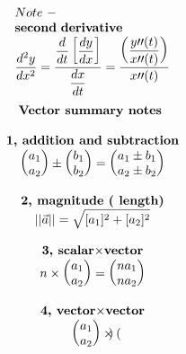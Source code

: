 \documentclass{article}
\begin{document}
\begin{multicols}{2}
\[\begin{array}{>{\displaystyle}l}
        \\
        Note\ -\ \\
        \mathbf{second\ derivative}\\
        \frac{d^{2} y}{dx^{2}} =\frac{\displaystyle \frac{d}{dt}\left[\displaystyle \frac{dy}{dx}\right]}{\displaystyle \frac{dx}{dt}} =\displaystyle  \frac{\left(\displaystyle \frac{y\prime \prime ( t)}{x\prime \prime ( t)}\right)}{x\prime \prime ( t)}    
    \end{array}
    \]
    \columnbreak
    \noindent 
    \[
    \begin{array}{>{\displaystyle}c}
        \textbf{Vector\ summary\ notes\ }\\
        \\
        \textbf{1, addition\ and\ subtraction}\\
        \begin{pmatrix}
        a_{1}\\
        a_{2}
        \end{pmatrix} \pm \begin{pmatrix}
        b_{1}\\
        b_{2}
        \end{pmatrix} =\begin{pmatrix}
        a_{1} \pm b_{1}\\
        a_{2} \pm b_{2}
        \end{pmatrix}\\
        \\
        \textbf{2, magnitude\ ( length)}\\
        ||\vec{a} ||=\sqrt{[ a_{1}]^{2} +[ a_{2}]^{2}}\\
        \\
        \textbf{3, scalar$\times$vector}\\
        n\times \begin{pmatrix}
        a_{1}\\
        a_{2}
        \end{pmatrix} =\begin{pmatrix}
        na_{1}\\
        na_{2}
        \end{pmatrix}\\
        \\
        \textbf{4, vector$\times$vector}\\
        \begin{pmatrix}
        a_{1}\\
        a_{2}
        \end{pmatrix} \times \begin{pmatrix}

\end{pmatrix}
\end{array}\]
\end{multicols}
\end{document}
